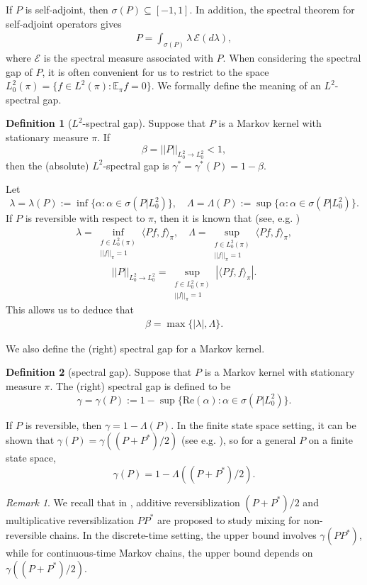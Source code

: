 \documentclass[12pt,a4]{amsart}
\numberwithin{equation}{section}
\theoremstyle{plain}
\theoremstyle{definition}
\newtheorem{definition}{Definition}[section]
\theoremstyle{remark}
\newtheorem{rk}{Remark}[section]
\newcommand{\1}{\mathds{1}}
\newcommand{\E}{\mathbb{E}}
\begin{document}
If $P$ is self-adjoint, then $\sigma(P) \subseteq [-1,1]$. In addition, the spectral theorem for self-adjoint operators gives
\begin{align}\label{eq:specthm}
	P = \int_{\sigma(P)} \lambda \, \mathcal{E}(d \lambda),
\end{align}
where $\mathcal{E}$ is the spectral measure associated with $P$. When considering the spectral gap of $P$, it is often convenient for us to restrict to the space $L^2_0(\pi) = \{f \in L^2(\pi) : \E_{\pi} f = 0\}$. We formally define the meaning of an $L^2$-spectral gap.
\begin{definition}[$L^2$-spectral gap]\label{def:L2speg}
	Suppose that $P$ is a Markov kernel with stationary measure $\pi$. If
	$$\beta = ||P||_{L^2_0 \to L^2_0} < 1,$$
	then the (absolute) $L^2$-spectral gap is $\gamma^* = \gamma^*(P) = 1 - \beta$.
\end{definition}
Let
$$\lambda = \lambda(P) := \inf \{ \alpha : \alpha \in \sigma(P|L^2_0) \}, \quad \Lambda = \Lambda(P) := \sup \{ \alpha : \alpha \in \sigma(P|L^2_0) \}.$$
If $P$ is reversible with respect to $\pi$, then it is known that (see, e.g. \cite{Rudolf12})
\begin{align}\label{eq:luspec}
	\lambda = \inf_{\substack{f \in L^2_0(\pi) \\ ||f||_{\pi}=1}} \langle Pf,f \rangle_{\pi}, \quad \Lambda = \sup_{\substack{f \in L^2_0(\pi) \\ ||f||_{\pi}=1}} \langle Pf,f \rangle_{\pi},
\end{align}
$$||P||_{L^2_0 \to L^2_0} = \sup_{\substack{f \in L^2_0(\pi) \\ ||f||_{\pi}=1}} |\langle Pf,f \rangle_{\pi}|.$$
This allows us to deduce that
\begin{align} \label{eq:specgap_Prev}
	\beta = \max\{|\lambda|, \Lambda \}.
\end{align}

We also define the (right) spectral gap for a Markov kernel.

\begin{definition}[spectral gap]\label{def:spectralgap}
	Suppose that $P$ is a Markov kernel with stationary measure $\pi$. The (right) spectral gap is defined to be
	$$\gamma = \gamma(P) := 1 - \sup \{ \mathrm{Re}(\alpha) : \alpha \in \sigma(P|L^2_0) \}.$$
\end{definition}

If $P$ is reversible, then $\gamma = 1 - \Lambda(P)$. In the finite state space setting, it can be shown that $\gamma(P) = \gamma((P+P^*)/2)$ (see e.g. \cite[discussion after Definition $2.1.3$, where we can consider $\lambda$ therein to be our $\gamma(P)$]{LSC97}), so for a general $P$ on a finite state space, $$\gamma(P) = 1 - \Lambda((P+P^*)/2).$$
\begin{rk}
	We recall that in \cite{Fill91}, additive reversiblization $(P+P^*)/2$ and multiplicative reversiblization $PP^*$ are proposed to study mixing for non-reversible chains. In the discrete-time setting, the upper bound involves $\gamma(PP^*)$, while for continuous-time Markov chains, the upper bound depends on $\gamma((P+P^*)/2)$.
\end{rk}
\end{document}
